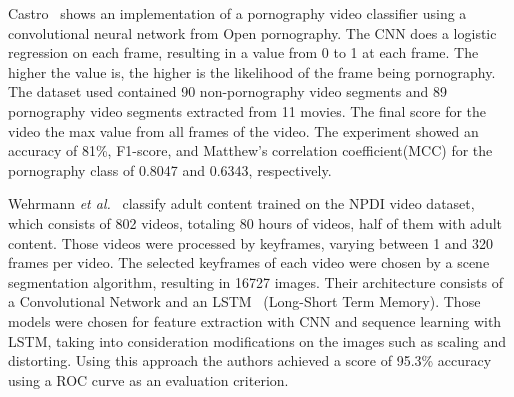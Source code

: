 Castro~\cite{torres2018automatic} shows an implementation of a pornography video classifier using a convolutional neural network from Open pornography\cite{mahadeokar2016open}.
The CNN does a logistic regression on each frame, resulting in a value from 0 to 1 at each frame.
The higher the value is, the higher is the likelihood of the frame being pornography.
The dataset used contained 90 non-pornography video segments and 89 pornography video segments extracted from 11 movies.
The final score for the video the max value from all frames of the video.
The experiment showed an accuracy of 81\%, F1-score, and Matthew’s correlation coefficient(MCC) for the pornography class of 0.8047 and 0.6343, respectively.

Wehrmann \textit{et al.}~\cite{wehrmann2018adult} classify adult content trained on the NPDI video dataset, which consists of 802 videos, totaling 80 hours of videos, half of them with adult content.
Those videos were processed by keyframes, varying between 1 and 320 frames per video.
The selected keyframes of each video were chosen by a scene segmentation algorithm, resulting in 16727 images.
Their architecture consists of a Convolutional Network and an LSTM~\cite{hochreiter1997long} (Long-Short Term Memory).
Those models were chosen for feature extraction with CNN and sequence learning with LSTM, taking into consideration modifications on the images such as scaling and distorting.
Using this approach the authors achieved a score of 95.3\% accuracy using a ROC curve as an evaluation criterion.

